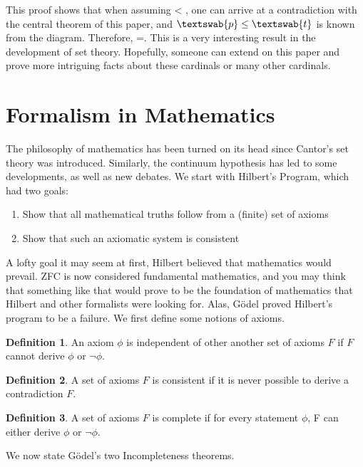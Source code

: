 \documentclass[12pt]{article}
\theoremstyle{definition}
\newtheorem{definition}{Definition}[section]
\begin{document}
This proof shows that when assuming  < , one can arrive at a contradiction with the central theorem of this paper, and $\textswab{p}\leq\textswab{t}$ is known from the diagram. Therefore, =. This is a very interesting result in the development of set theory. Hopefully, someone can extend on this paper and prove more intriguing facts about these cardinals or many other cardinals.



\section{Formalism in Mathematics}
The philosophy of mathematics has been turned on its head since Cantor's set theory was introduced. Similarly, the continuum hypothesis has led to some developments, as well as new debates. We start with Hilbert's Program, which had two goals:
\begin{enumerate}
    \item Show that all mathematical truths follow from a (finite) set of axioms
    \item Show that such an axiomatic system is consistent
\end{enumerate}

A lofty goal it may seem at first, Hilbert believed that mathematics would prevail. ZFC is now considered fundamental mathematics, and you may think that something like that would prove to be the foundation of mathematics that Hilbert and other formalists were looking for. Alas, Gödel proved Hilbert's program to be a failure. We first define some notions of axioms.

\begin{definition}
    An axiom $\phi$ is independent of other another set of axioms $F$ if $F$ cannot derive $\phi$ or $\neg\phi$.
\end{definition}

\begin{definition}
    A set of axioms $F$ is consistent if it is never possible to derive a contradiction $F$.
\end{definition}

\begin{definition}
    A set of axioms $F$ is complete if for every statement $\phi$, F can either derive $\phi$ or $\neg\phi$.    
\end{definition}

We now state Gödel's two Incompleteness theorems.
\end{document}
